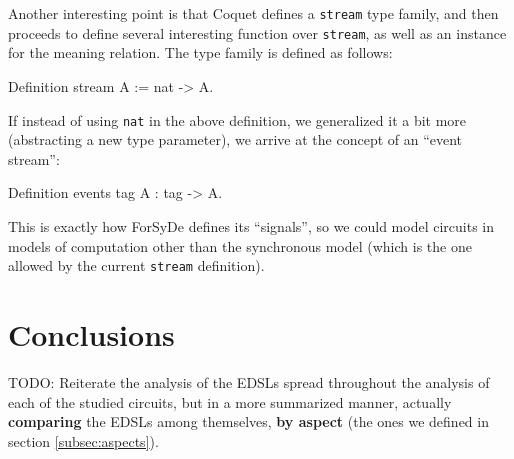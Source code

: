 \documentclass[a4paper]{article}
\begin{document}
                Another interesting point is that Coquet defines a \texttt{stream} type family, and
                then proceeds to define several interesting function over \texttt{stream}, as well
                as an instance for the meaning relation. The type family is defined as follows:
                \begin{coqcode}
        Definition stream A := nat -> A.
                \end{coqcode}
                If instead of using \texttt{nat} in the above definition, we generalized it a bit
                more (abstracting a new type parameter), we arrive at the concept of an ``event
                stream'':
                \begin{coqcode}
        Definition events tag A : tag -> A.
                \end{coqcode}
                This is exactly how ForSyDe defines its ``signals'', so we could model circuits in
                models of computation other than the synchronous model (which is the one allowed by
                the current \texttt{stream} definition).



    \section{Conclusions}
    \label{sec:conclusions}
        TODO: Reiterate the analysis of the EDSLs spread throughout the analysis of each of the
        studied circuits, but in a more summarized manner, actually \textbf{comparing} the EDSLs
        among themselves, \textbf{by aspect} (the ones we defined in section \ref{subsec:aspects}).


    
    
\end{document}
